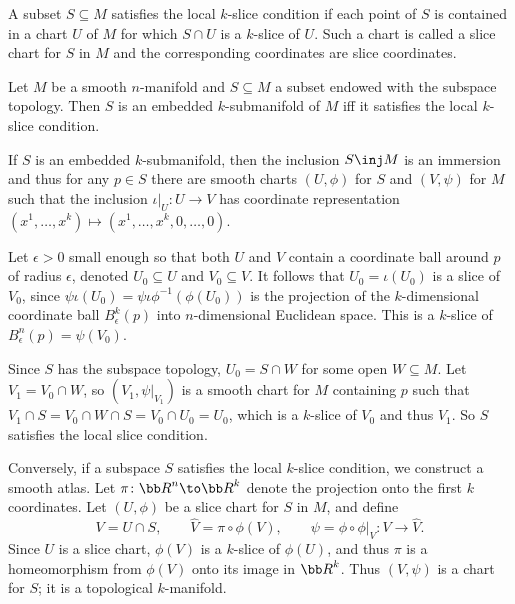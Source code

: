     A subset $S\subseteq M$ satisfies the {\emphcolor local $k$-slice condition} if each point of $S$ is contained in
    a chart $U$ of $M$ for which $S\cap U$ is a $k$-slice of $U$.
    Such a chart is called a {\emphcolor slice chart} for $S$ in $M$ and the corresponding coordinates are {\emphcolor slice
    coordinates}.

\edefn

\bthrm[title=Local slice criterion]

    Let $M$ be a smooth $n$-manifold and $S\subseteq M$ a subset endowed with the subspace topology.
    Then $S$ is an embedded $k$-submanifold of $M$ iff it satisfies the local $k$-slice condition.

\ethrm

\bproof

    If $S$ is an embedded $k$-submanifold, then the inclusion $S\inj M$ is an immersion and thus for any $p\in S$
    there are smooth charts $(U,\phi)$ for $S$ and $(V,\psi)$ for $M$ such that the inclusion $\iota|_U\colon U\to V$
    has coordinate representation $(x^1,\dots,x^k)\mapsto(x^1,\dots,x^k,0,\dots,0)$.

    Let $\epsilon>0$ small enough so that both $U$ and $V$ contain a coordinate ball around $p$ of radius $\epsilon$,
    denoted $U_0\subseteq U$ and $V_0\subseteq V$.
    It follows that $U_0=\iota(U_0)$ is a slice of $V_0$, since $\psi\iota(U_0)=\psi\iota\phi^{-1}(\phi(U_0))$ is
    the projection of the $k$-dimensional coordinate ball $B^k_\epsilon(p)$ into $n$-dimensional Euclidean space.
    This is a $k$-slice of $B_\epsilon^n(p)=\psi(V_0)$.

    Since $S$ has the subspace topology, $U_0=S\cap W$ for some open $W\subseteq M$.
    Let $V_1=V_0\cap W$, so $(V_1,\psi|_{V_1})$ is a smooth chart for $M$ containing $p$ such that
    $V_1\cap S=V_0\cap W\cap S=V_0\cap U_0=U_0$, which is a $k$-slice of $V_0$ and thus $V_1$.
    So $S$ satisfies the local slice condition.

    Conversely, if a subspace $S$ satisfies the local $k$-slice condition, we construct a smooth atlas.
    Let $\pi\colon\bR^n\to\bR^k$ denote the projection onto the first $k$ coordinates.
    Let $(U,\phi)$ be a slice chart for $S$ in $M$, and define
    $$ V = U\cap S,\qquad \hat V = \pi\circ\phi(V),\qquad \psi=\phi\circ\phi|_V\colon V\to\hat V . $$
    Since $U$ is a slice chart, $\phi(V)$ is a $k$-slice of $\phi(U)$, and thus $\pi$ is a homeomorphism from
    $\phi(V)$ onto its image in $\bR^k$.
    Thus $(V,\psi)$ is a chart for $S$; it is a topological $k$-manifold.

